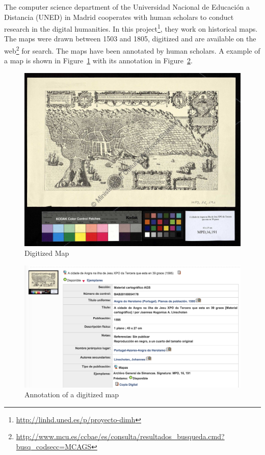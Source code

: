\documentclass[11pt]{report}
\begin{document}
 The computer science department of the Universidad Nacional de Educación a Distancia (UNED) in Madrid cooperates with human scholars to conduct research in the digital humanities. In this project\footnote{\url{http://linhd.uned.es/p/proyecto-dimh}}, they work on historical maps. The maps were drawn between 1503 and 1805, digitized and are available on the web\footnote{\url{http://www.mcu.es/ccbae/es/consulta/resultados_busqueda.cmd?busq_codsecc=MCAGS}} for search. The maps have been annotated by human scholars. A example of a map is shown in Figure~\ref{figure:map} with its annotation in Figure~\ref{figure:metadata}. \\
 
\begin{figure}[!ht]
	\centering
	\includegraphics[width=\linewidth]{./images/map}
\caption{Digitized Map}
\label{figure:map}
\end{figure}

\begin{figure}[!ht]
	\centering
	\includegraphics[width=\linewidth]{./images/metadata}
\caption{Annotation of a digitized map}
\label{figure:metadata}
\end{figure}
\end{document}

